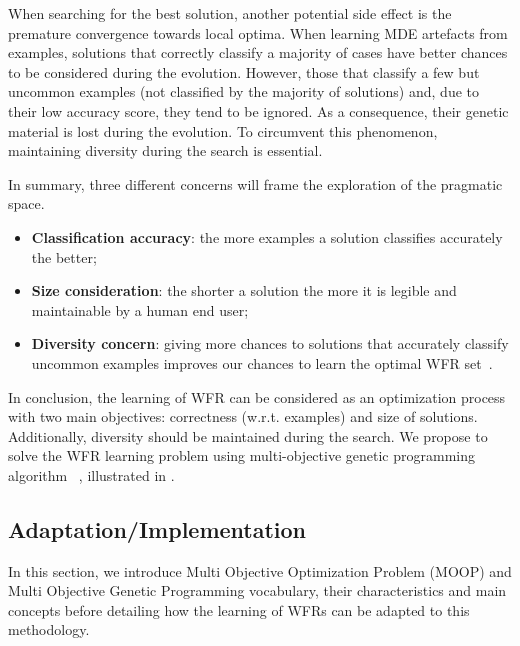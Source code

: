  When searching for the best solution, another potential side effect is the premature convergence towards local optima. When learning MDE artefacts from examples, solutions that correctly classify a majority of cases have better chances to be considered during the evolution. 
However, those that classify a few but uncommon examples (not classified by the majority of solutions) and, due to their low accuracy score, they tend to be ignored. As a consequence, their genetic material is lost during the evolution. 
To circumvent this phenomenon, maintaining diversity during the search is essential.

In summary, three different concerns will frame the exploration of the pragmatic space.
\begin{itemize}
	\item \textbf{Classification accuracy}: the more examples a solution classifies accurately the better;
	\item \textbf{Size consideration}: the shorter a solution the more it is legible and maintainable by a human end user;
	\item \textbf{Diversity concern}: giving more chances to solutions that accurately classify uncommon examples improves our chances to learn the optimal WFR set~\citep{batot2018}.
\end{itemize}

In conclusion, the learning of WFR can be considered as an optimization process with two main objectives: correctness (w.r.t. examples) and size of solutions. Additionally, diversity should be maintained during the search. We propose to solve the WFR learning problem using multi-objective genetic programming algorithm \nsga~\citep{deb2000}, illustrated in .



\subsection{Adaptation/Implementation}
In this section, we introduce Multi Objective Optimization Problem (MOOP) and Multi Objective Genetic Programming vocabulary, their characteristics and main concepts before detailing how the learning of WFRs can be adapted to this methodology.



